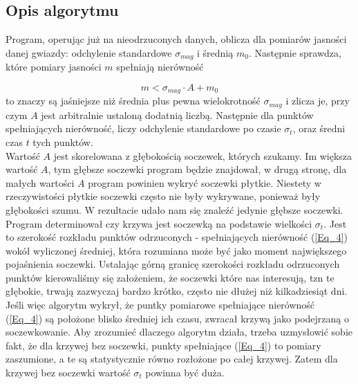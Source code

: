 \documentclass[a4paper,11pt]{article}
\newcommand{\ak}{\hspace{0.7 cm}}
\begin{document}
\subsection{Opis algorytmu}
\ak Program, operując już na nieodrzuconych danych, oblicza dla pomiarów jasności danej gwiazdy: odchylenie standardowe  $\sigma_{mag}$ i średnią $m_0$. Następnie  sprawdza, które pomiary jasności $m$ spełniają nierówność

\begin{equation}
m<\sigma_{mag}\cdot A+m_0 
\label{Eq_4}
\end{equation}
to znaczy są jaśniejsze niż średnia plus pewna wielokrotność $\sigma_{mag}$ i zlicza je, przy czym $A$ jest arbitralnie ustaloną dodatnią liczbą. Następnie dla punktów spełniających nierówność, liczy odchylenie standardowe po czasie $\sigma_t$, oraz średni czas $t$ tych punktów. \\ 
Wartość $A$ jest skorelowana z głębokością soczewek, których szukamy. Im większa wartość $A$, tym głębsze soczewki program będzie znajdował, w drugą stronę, dla małych wartości $A$ program powinien wykryć soczewki płytkie. Niestety w rzeczywistości płytkie soczewki często nie były wykrywane, ponieważ były głębokości szumu. W rezultacie udało nam się znaleźć jedynie głębsze soczewki.  \\

\ak Program determinował czy krzywa jest soczewką na podstawie wielkości $\sigma_t$. Jest to szerokość rozkładu punktów odrzuconych - spełniających nierówność 
		(\ref{Eq_4}) wokół wyliczonej średniej, która rozumiana może być jako moment największego pojaśnienia soczewki. Ustalając górną granicę szerokości rozkładu odrzuconych punktów kierowaliśmy się założeniem, że soczewki które nas interesują, tzn te głębokie, trwają zazwyczaj bardzo krótko, często nie dłużej niż kilkadziesiąt dni. Jeśli więc algorytm wykrył, że puntky pomiarowe spełniające nierówność (\ref{Eq_4}) są położone blisko średniej ich czasu, zwracał krzywą jako podejrzaną o soczewkowanie. Aby zrozumieć dlaczego algorytm działa, trzeba uzmysłowić sobie fakt, że dla krzywej bez soczewki, punkty spełniające (\ref{Eq_4}) to pomiary zaszumione, a te są statystycznie równo rozłożone po całej krzywej. Zatem dla krzywej bez soczewki wartość $\sigma_t$ powinna być duża.
\end{document}
